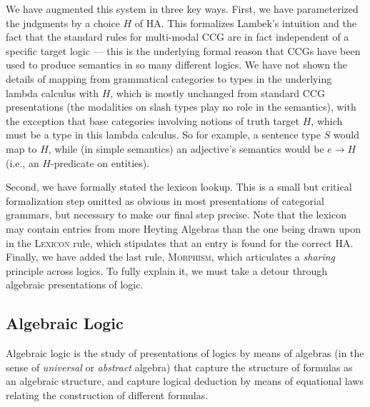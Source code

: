 \documentclass[11pt,a4paper,acceptedWithA]{article}
\newcommand{\ha}{\textsc{HA}\xspace}
\newcommand{\ccg}{\textsc{CCG}\xspace}
\newcommand{\ccgs}{\textsc{CCG}s\xspace}
\begin{document}

We have augmented this system in three key ways.
First, we have parameterized the judgments by a choice $H$ of \ha. This formalizes Lambek's intuition and the fact that the standard rules for multi-modal \ccg are in fact independent of a specific target logic --- this is the underlying formal reason that \ccgs have been used to produce semantics in so many different logics. We have not shown the details of mapping from grammatical categories to types in the underlying lambda calculus with $H$, which is mostly unchanged from standard \ccg presentations (the modalities on slash types play no role in the semantics), with the exception that base categories involving notions of truth target $H$, which must be a type in this lambda calculus. So for example, a sentence type $S$ would map to $H$, while (in simple semantics) an adjective's semantics would be $e\rightarrow H$ (i.e., an $H$-predicate on entities).

Second, we have formally stated the lexicon lookup. This is a small but critical formalization step omitted as obvious in most presentations of categorial grammars, but necessary to make our final step precise. Note that the lexicon may contain entries from more Heyting Algebras than the one being drawn upon in the \textsc{Lexicon} rule, which stipulates that an entry is found for the correct \ha.
Finally, we have added the last rule, \textsc{Morphism}, which articulates a \emph{sharing} principle across logics. To fully explain it, we must take a detour through algebraic presentations of logic.




\subsection{Algebraic Logic}
Algebraic logic is the study of presentations of logics by means of algebras (in the sense of \emph{universal} or \emph{abstract} algebra) that capture the structure of formulas as an algebraic structure, and capture logical deduction by means of equational laws relating the construction of different formulas.
\end{document}
